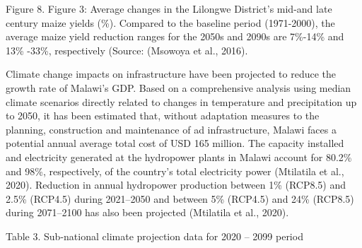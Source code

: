 \documentclass[
]{book}
\begin{document}
Figure 8. Figure 3: Average changes in the Lilongwe District's mid-and late century maize yields (\%). Compared to the baseline period (1971-2000), the average
maize yield reduction ranges for the 2050s and 2090s are 7\%-14\% and 13\% -33\%, respectively (Source: (Msowoya et al., 2016).

Climate change impacts on infrastructure have been projected to reduce the growth rate of Malawi's GDP. Based on a comprehensive analysis using median climate
scenarios directly related to changes in temperature and precipitation up to 2050, it has been estimated that, without adaptation measures to the planning,
construction and maintenance of ad infrastructure, Malawi faces a potential annual average total cost of USD 165 million. The capacity installed and electricity
generated at the hydropower plants in Malawi account for 80.2\% and 98\%, respectively, of the country's total electricity power (Mtilatila et al., 2020).
Reduction in annual hydropower production between 1\% (RCP8.5) and 2.5\% (RCP4.5) during 2021--2050 and between 5\% (RCP4.5) and 24\% (RCP8.5) during 2071--2100 has
also been projected (Mtilatila et al., 2020).

Table 3. Sub-national climate projection data for 2020 -- 2099 period
\end{document}
